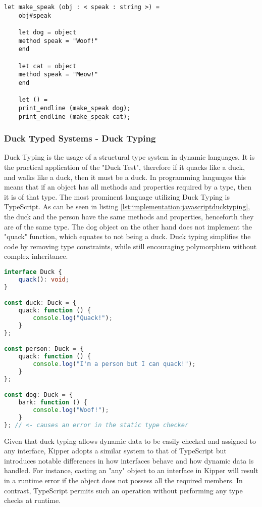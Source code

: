 \begin{lstlisting}[language=caml,caption=Example of structural typing in Ocaml,label=lst:implementation:ocamlstructuraltyping]
	let make_speak (obj : < speak : string >) =
	obj#speak
	
	let dog = object
	method speak = "Woof!"
	end
	
	let cat = object
	method speak = "Meow!"
	end
	
	let () =
	print_endline (make_speak dog);
	print_endline (make_speak cat);
\end{lstlisting}

\subsubsection{Duck Typed Systems - Duck Typing}

Duck Typing is the usage of a structural type system in dynamic languages. It is the practical application of the "Duck Test", therefore if it quacks like a duck, and walks like a duck, then it must be a duck. In programming languages this means that if an object has all methods and properties required by a type, then it is of that type. The most prominent language utilizing Duck Typing is TypeScript. As can be seen in listing \ref{lst:implementation:javascriptducktyping}, the duck and the person have the same methods and properties, henceforth they are of the same type. The dog object on the other hand does not implement the "quack" function, which equates to not being a duck. Duck typing simplifies the code by removing type constraints, while still encouraging polymorphism without complex inheritance.

\begin{lstlisting}[language=Typescript,caption=Example of duck typing in TypeScript,label=lst:implementation:javascriptducktyping]
interface Duck {
	quack(): void;	
}

const duck: Duck = {
	quack: function () {
		console.log("Quack!");
	}
};

const person: Duck = {
	quack: function () {
		console.log("I'm a person but I can quack!");
	}
};

const dog: Duck = {
	bark: function () {
		console.log("Woof!");
	}
}; // <- causes an error in the static type checker
\end{lstlisting}

Given that duck typing allows dynamic data to be easily checked and assigned to any interface, Kipper adopts a similar system to that of TypeScript but introduces notable differences in how interfaces behave and how dynamic data is handled. For instance, casting an "any" object to an interface in Kipper will result in a runtime error if the object does not possess all the required members. In contrast, TypeScript permits such an operation without performing any type checks at runtime.

